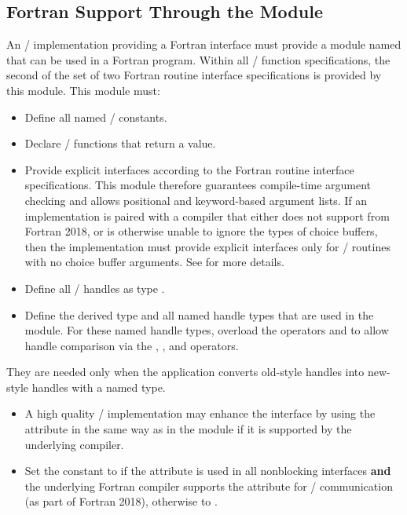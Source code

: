 \subsection{Fortran Support Through the \texorpdfstring{}{mpi} Module}
\label{f90:extended}

An \MPI/ implementation providing a Fortran interface must provide a module named  that
can be used in a Fortran program.
Within all \MPI/ function specifications,
the second of the set of two Fortran routine interface specifications is provided by this module.
This module must:
\begin{itemize}
\item Define all named \MPI/ constants.
\item Declare \MPI/ functions that return a value.
\item Provide explicit interfaces according to the Fortran routine interface specifications.
      This module therefore guarantees compile-time argument checking
      and allows positional and keyword-based argument lists.
      If an implementation is paired with a compiler that either does
      not support  from
      Fortran 2018, or is
      otherwise unable to ignore the types of choice buffers, then the
      implementation must provide explicit interfaces only for \MPI/
      routines with no choice buffer arguments. See
       for more
      details.
\item Define all \MPI/ handles as type .
\item Define the derived type 
      and all named handle types that are used in the  module.
For these named handle types, overload the
operators  and  to allow handle comparison
via the , , \code{==} and \code{/=} operators.
\end{itemize}

\begin{rationale}
                             They are needed only when the application
                             converts old-style 
                             handles into new-style handles with a named type.
\end{rationale}
\begin{itemize}
\item A high quality \MPI/ implementation may enhance the interface
by using the  attribute in the same way
as in the  module
if it is supported by the underlying compiler.
\item Set the   constant
 to \gb{}
if the  attribute is used in all nonblocking interfaces
\textbf{and} the underlying Fortran compiler supports the 
attribute for \MPI/ communication (as part of Fortran 2018),
otherwise to .
\end{itemize}

